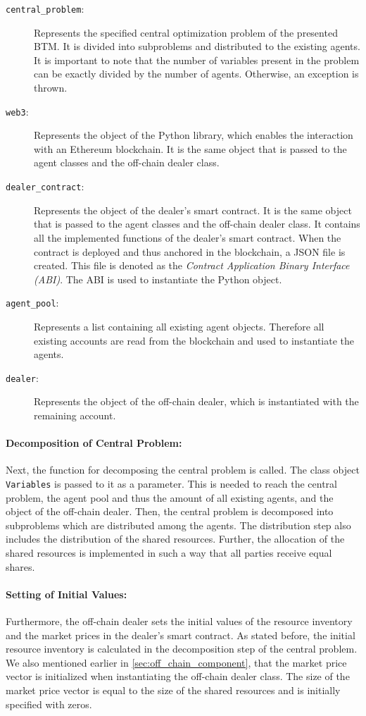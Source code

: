 \begin{description}
	\item[\texttt{central\_problem}:] Represents the specified central optimization problem of the presented BTM.
    It is divided into subproblems and distributed to the existing agents. It is important 
    to note that the number of variables present in the problem can be exactly divided by the number of agents.
    Otherwise, an exception is thrown.
	\item[\texttt{web3}:] Represents the object of the Python library, which enables the interaction with an
	Ethereum blockchain. It is the same object that is passed to the agent classes and the off-chain dealer class.
    \item[\texttt{dealer\_contract}:] Represents the object of the dealer's smart contract. 
    It is the same object that is passed to the agent classes and the off-chain dealer class. It contains all the
    implemented functions of the dealer's smart contract. When the contract is deployed and thus anchored in the blockchain, a JSON file is created. 
    This file is denoted as the \textit{Contract Application Binary Interface (ABI)}. The ABI is used to instantiate the Python object.  
    \item[\texttt{agent\_pool}:] Represents a list containing all existing agent objects. 
    Therefore all existing accounts are read from the blockchain and used to instantiate the agents.
    \item[\texttt{dealer}:] Represents the object of the off-chain dealer, which is instantiated with the 
    remaining account.
\end{description}

\paragraph{Decomposition of Central Problem:} Next, the function for decomposing the central problem is called. The class object \verb|Variables| is passed to it as a parameter.
This is needed to reach the central problem, the agent pool and thus the amount of all existing agents, and the object of the
off-chain dealer. 
Then, the central problem is decomposed into subproblems which are distributed among the agents. 
The distribution step also includes the distribution of the shared resources. 
Further, the allocation of the shared resources is implemented in such a way that all parties receive equal shares.

\paragraph{Setting of Initial Values:} Furthermore, the off-chain dealer sets the initial values of the resource inventory and the market prices in the dealer's
smart contract. As stated before, the initial resource inventory is calculated in the decomposition step of the central problem. 
We also mentioned earlier in \ref{sec:off_chain_component}, that the market price vector is initialized when instantiating the off-chain dealer class.
The size of the market price vector is equal to the size of the shared resources and is initially specified with zeros.\\

